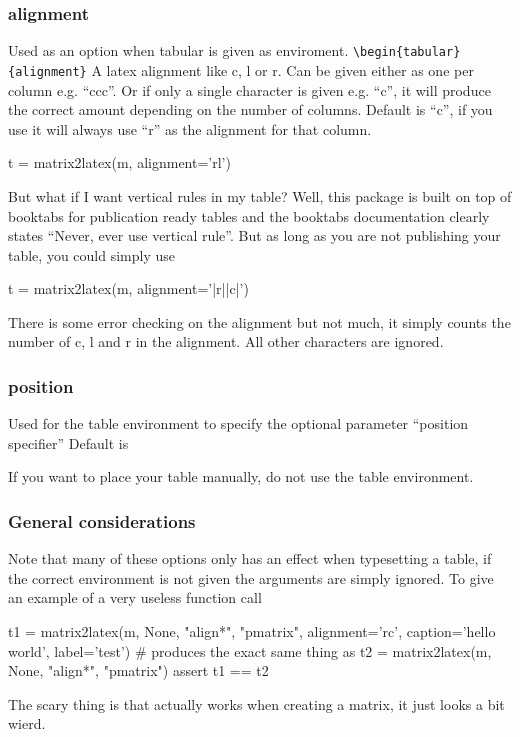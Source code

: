 {{\subsubsection{alignment}
Used as an option when tabular is given as enviroment.
\verb!\begin{tabular}{alignment}!
A latex alignment like c, l or r.
Can be given either as one per column e.g. ``ccc''.
Or if only a single character is given e.g. ``c'',
it will produce the correct amount depending on the number of columns.
Default is ``c'', if you use  it will always use
``r'' as the alignment for that column.
\begin{pyblock}
t = matrix2latex(m, alignment='rl')
\end{pyblock}

But what if I want vertical rules in my table? Well, this package is built
on top of booktabs for publication ready tables and the booktabs documentation clearly
states ``Never, ever use vertical rule''. But as long as you are not publishing your table,
you could simply use
\begin{pyblock}
t = matrix2latex(m, alignment='|r||c|')
\end{pyblock}

There is some error checking on the alignment but not much, it simply counts the number
of c, l and r in the alignment. All other characters are ignored.

\subsubsection{position}
Used for the table environment to specify the optional parameter ``position specifier''
Default is 

If you want to place your table manually, do not use the table environment.

\subsubsection{General considerations}
Note that many of these options only has an effect when typesetting a table,
if the correct environment is not given the arguments are simply ignored.
To give an example of a very useless function call
\begin{pyblock}
t1 = matrix2latex(m, None, "align*", "pmatrix",
                 alignment='rc',
                 caption='hello world',
                 label='test')
# produces the exact same thing as
t2 = matrix2latex(m, None, "align*", "pmatrix")
assert t1 == t2
\end{pyblock}
The scary thing is that  actually works when creating a matrix,
it just looks a bit wierd.

}}
